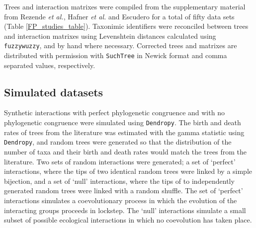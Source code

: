 Trees and interaction matrixes were compiled from the supplementary material from Rezende {\em et al.}, \cite{rezende2007non} Hafner {\em et al.} \cite{hafner1994disparate} and Escudero \cite{escudero2015phylogenetic} for a total of fifty data sets (Table \ref{FP_studies_table}). Taxonimic identifiers were reconciled between trees and interaction matrixes using Levenshtein distances \cite{levenshtein1966binary} calculated using {\tt fuzzywuzzy}, \cite{fuzzywuzzy} and by hand where necessary. Corrected trees and matrixes are distributed with permission with {\tt SuchTree} in Newick format and comma separated values, respectively.

\subsection{Simulated datasets}

Synthetic interactions with perfect phylogenetic congruence and with no phylogenetic congruence were simulated using {\tt Dendropy}. \cite{sukumaran2010dendropy} The birth and death rates of trees from the literature was estimated with the gamma statistic \cite{pybus2000testing} using {\tt Dendropy}, and random trees were generated so that the distribution of the number of taxa and their birth and death rates would match the trees from the literature. Two sets of random interactions were generated; a set of `perfect' interactions, where the tips of two identical random trees were linked by a simple bijection, and a set of `null' interactions, where the tips of to independently generated random trees were linked with a random shuffle. The set of `perfect' interactions simulates a coevolutionary process in which the evolution of the interacting groups proceeds in lockstep. The `null' interactions simulate a small subset of possible ecological interactions in which no coevolution has taken place.